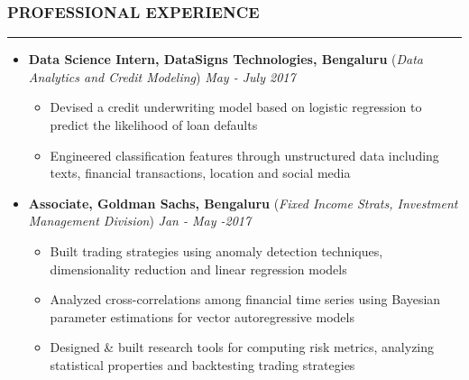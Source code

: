 \documentclass[10pt,a4paper,English]{article}
\newcommand\roottitle[1]{\vspace{-4mm}\subsubsection*{\uppercase{#1}}\vspace{-0.3em}\nopagebreak[4]\hrule\vspace{4mm}}
\newcommand\itemyear[1]{\hfill \emph{\color{itemyear} #1}}
\newcommand\itemenv{\setlength\itemsep{0.5pt} \addtolength{\itemindent}{-5mm}\vspace{-1.5mm}}
\begin{document}
\vspace{1.5mm}

\roottitle{Professional Experience}
\begin{itemize} \itemenv

    \item \textbf{Data Science Intern, DataSigns Technologies, Bengaluru } \hfill({\emph{Data Analytics and Credit Modeling}}) \itemyear{May - July 2017}
        \begin{itemize} \itemenv
            \item Devised a credit underwriting model based on logistic regression to predict the likelihood of loan defaults
            \item Engineered classification features through unstructured data including texts, financial transactions, location and social media
        \end{itemize}

    \item \textbf{Associate, Goldman Sachs, Bengaluru} \hfill (\emph{Fixed Income Strats, Investment Management Division}) \itemyear{Jan - May -2017}
        \begin{itemize} \itemenv
            \item Built trading strategies using anomaly detection techniques, dimensionality reduction and linear regression models
             \item Analyzed cross-correlations among financial time series using Bayesian parameter estimations for vector autoregressive models
            \item Designed \& built research tools for computing risk metrics, analyzing statistical properties and backtesting trading strategies
        \end{itemize}


\end{itemize}
\end{document}

